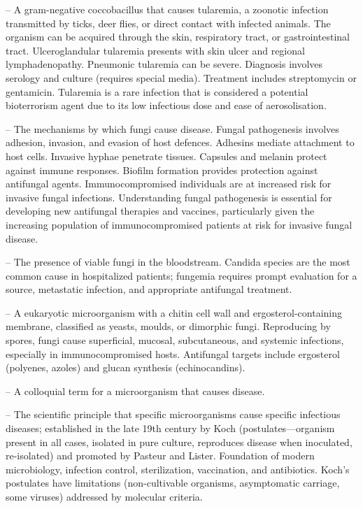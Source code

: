 -- A gram-negative coccobacillus that causes tularemia, a zoonotic infection transmitted by ticks, deer flies, or direct contact with infected animals. The organism can be acquired through the skin, respiratory tract, or gastrointestinal tract. Ulceroglandular tularemia presents with skin ulcer and regional lymphadenopathy. Pneumonic tularemia can be severe. Diagnosis involves serology and culture (requires special media). Treatment includes streptomycin or gentamicin. Tularemia is a rare infection that is considered a potential bioterrorism agent due to its low infectious dose and ease of aerosolisation.

-- The mechanisms by which fungi cause disease. Fungal pathogenesis involves adhesion, invasion, and evasion of host defences. Adhesins mediate attachment to host cells. Invasive hyphae penetrate tissues. Capsules and melanin protect against immune responses. Biofilm formation provides protection against antifungal agents. Immunocompromised individuals are at increased risk for invasive fungal infections. Understanding fungal pathogenesis is essential for developing new antifungal therapies and vaccines, particularly given the increasing population of immunocompromised patients at risk for invasive fungal disease.

-- The presence of viable fungi in the bloodstream. Candida species are the most common cause in hospitalized patients; fungemia requires prompt evaluation for a source, metastatic infection, and appropriate antifungal treatment.

-- A eukaryotic microorganism with a chitin cell wall and ergosterol-containing membrane, classified as yeasts, moulds, or dimorphic fungi. Reproducing by spores, fungi cause superficial, mucosal, subcutaneous, and systemic infections, especially in immunocompromised hosts. Antifungal targets include ergosterol (polyenes, azoles) and glucan synthesis (echinocandins).

-- A colloquial term for a microorganism that causes disease.

-- The scientific principle that specific microorganisms cause specific infectious diseases; established in the late 19th century by Koch (postulates—organism present in all cases, isolated in pure culture, reproduces disease when inoculated, re-isolated) and promoted by Pasteur and Lister. Foundation of modern microbiology, infection control, sterilization, vaccination, and antibiotics. Koch's postulates have limitations (non-cultivable organisms, asymptomatic carriage, some viruses) addressed by molecular criteria.

